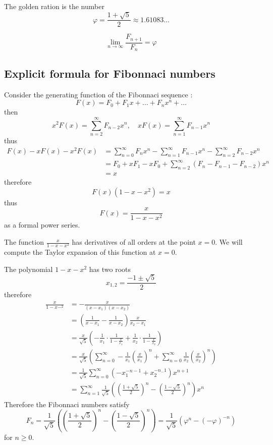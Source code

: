 \begin{definition}
The golden ration is the number
$$
\varphi=\frac{1+\sqrt{ 5 }}{2}\approx1.61083\dots
$$
\end{definition}
\begin{proposition}
$$
\lim_{ n \to \infty } \frac{F_{n+1}}{F_{n}}=\varphi
$$
\end{proposition}

\subsection{Explicit formula for Fibonnaci numbers}

Consider the generating function of the Fibonnaci sequence :
$$
F(x)=F_{0}+F_{1}x+\dots +F_{n}x^{n}+\dots
$$
then
$$
x^{2}F(x)=\sum_{n=2}^{\infty} F_{n-2}x^{n},\quad xF(x)=\sum_{n=1}^{\infty} F_{n-1}x^{n} 
$$
thus
\begin{align*}
F(x)-xF(x)-x^{2}F(x) & =\sum_{n=0}^{\infty} F_{n}x^{n}-\sum_{n=1}^{\infty} F_{n-1}x^{n}-\sum_{n=2}^{\infty} F_{n-2}x^{n} \\
  & =F_{0}+xF_{1}-xF_{0}+\sum_{n=2}^{\infty} (F_{n}-F_{n-1}-F_{n-2})x^{n} \\
 & =x
\end{align*}
therefore
$$
F(x)(1-x-x^{2})=x
$$
thus
$$
F(x)=\frac{x}{1-x-x^{2}}
$$
as a formal power series.

The function $\frac{x}{1-x-x^{2}}$ has derivatives of all orders at the point $x=0$. We will compute the Taylor expansion of this function at $x=0$. 

The polynomial $1-x-x^{2}$ has two roots
$$
x_{1,2}=\frac{-1\pm \sqrt{ 5 }}{2}
$$
therefore
\begin{align*}
 \frac{x}{1-x-^{2}} & =-\frac{x}{(x-x_{1})(x-x_{2})} \\
 &=\left( \frac{1}{x-x_{1}}-\frac{1}{x-x_{2}} \right) \frac{x}{x_{2}-x_{1}} \\
 & =\frac{x}{\sqrt{ 5 }}\left( -\frac{1}{x_{1}}\cdot \frac{1}{1-\frac{x}{x_{1}}}+\frac{1}{x_{2}}\cdot \frac{1}{1-\frac{x}{x_{2}}}  \right) \\
 & =\frac{x}{\sqrt{ 5 }}\left( \sum_{n=0}^{\infty}  -\frac{1}{x_{1}} \left( \frac{x}{x_{1}} \right)^{n}+\sum_{n=0}^{\infty}  \frac{1}{x_{2}}\left( \frac{x}{x_{2}} \right)^{n}\right) \\
 & =\frac{1}{\sqrt{ 5 }}\sum_{n=0}^{\infty} (-x_{1}^{-n-1}+x_{2}^{-n_-1})x^{n+1} \\
 & =\sum_{n=1}^{\infty}  \frac{1}{\sqrt{ 5 }}\left( \left( \frac{1+\sqrt{ 5 }}{2} \right)^{n}-\left( \frac{1-\sqrt{ 5 }}{2} \right)^{n} \right)x^{n}
\end{align*}
Therefore the Fibonnaci numbers satisfy
$$
F_{n}=\frac{1}{\sqrt{ 5 }}\left( \left( \frac{1+\sqrt{ 5 }}{2} \right)^{n}-\left( \frac{1-\sqrt{ 5 }}{2} \right)^{n} \right)=\frac{1}{\sqrt{ 5 }}(\varphi^{n}-(-\varphi)^{-n})
$$
for $n\ge 0$.